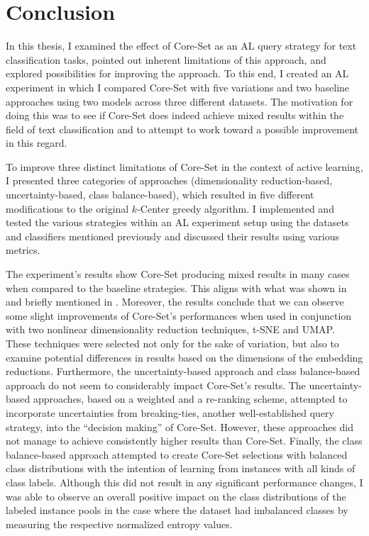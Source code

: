 \documentclass[english,bachelor,ul]{webisthesis} %
\begin{document}
\chapter{Conclusion}

In this thesis, I examined the effect of Core-Set as an AL query strategy for text classification tasks, pointed out inherent limitations of this approach, and explored possibilities for improving the approach. To this end, I created an AL experiment in which I compared Core-Set with five variations and two baseline approaches using two models across three different datasets. The motivation for doing this was to see if Core-Set does indeed achieve mixed results within the field of text classification and to attempt to work toward a possible improvement in this regard. 

To improve three distinct limitations of Core-Set in the context of active learning, I presented three categories of approaches (dimensionality reduction-based, uncertainty-based, class balance-based), which resulted in five different modifications to the original $k$-Center greedy algorithm. I implemented and tested the various strategies within an AL experiment setup using the datasets and classifiers mentioned previously and discussed their results using various metrics. 


The experiment's results show Core-Set producing mixed results in many cases when compared to the baseline strategies. This aligns with what was shown in \cite{DBLP:conf/kdd/0002MM21} and briefly mentioned in \cite{DBLP:conf/aaai/ColemanCKCBBNSZ22}. Moreover, the results conclude that we can observe some slight improvements of Core-Set's performances when used in conjunction with two nonlinear dimensionality reduction techniques, t-SNE and UMAP. These techniques were selected not only for the sake of variation, but also to examine potential differences in results based on the dimensions of the embedding reductions. Furthermore, the uncertainty-based approach and class balance-based approach do not seem to considerably impact Core-Set's results. The uncertainty-based approaches, based on a weighted and a re-ranking scheme, attempted to incorporate uncertainties from breaking-ties, another well-established query strategy, into the ``decision making'' of Core-Set. However, these approaches did not manage to achieve consistently higher results than Core-Set. Finally, the class balance-based approach attempted to create Core-Set selections with balanced class distributions with the intention of learning from instances with all kinds of class labels. Although this did not result in any significant performance changes, I was able to observe an overall positive impact on the class distributions of the labeled instance pools in the case where the dataset had imbalanced classes by measuring the respective normalized entropy values.
\end{document}
